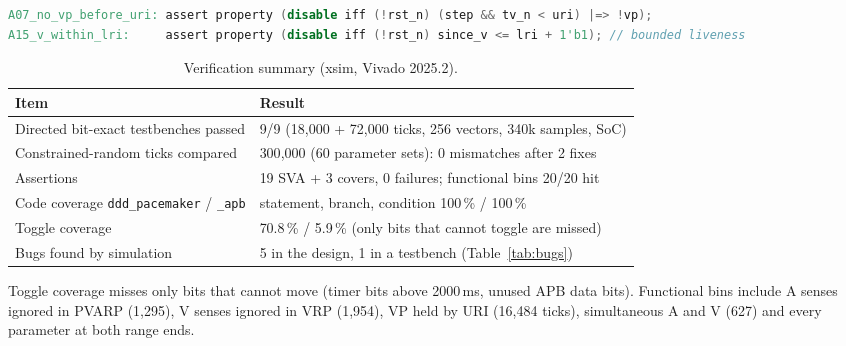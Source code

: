 \documentclass[11pt,a4paper]{article}
\begin{document}
\begin{lstlisting}[language=Verilog,caption={Two of the 19 SVA assertions (bound to \texttt{ddd\_pacemaker}).},label={lst:sva}]
A07_no_vp_before_uri: assert property (disable iff (!rst_n) (step && tv_n < uri) |=> !vp);
A15_v_within_lri:     assert property (disable iff (!rst_n) since_v <= lri + 1'b1); // bounded liveness
\end{lstlisting}

\begin{table}[!tbp]\centering\footnotesize
\caption{Verification summary (xsim, Vivado 2025.2).}\label{tab:simsummary}
\begin{tabularx}{\linewidth}{@{}Xl@{}}
\toprule
Item & Result\\
\midrule
Directed bit-exact testbenches passed & 9/9 (18{,}000 + 72{,}000 ticks, 256 vectors, 340k samples, SoC)\\
Constrained-random ticks compared & 300{,}000 (60 parameter sets): 0 mismatches after 2 fixes\\
Assertions & 19 SVA + 3 covers, 0 failures; functional bins 20/20 hit\\
Code coverage \texttt{ddd\_pacemaker} / \texttt{\_apb} & statement, branch, condition 100\,\% / 100\,\%\\
Toggle coverage & 70.8\,\% / 5.9\,\% (only bits that cannot toggle are missed)\\
Bugs found by simulation & 5 in the design, 1 in a testbench (Table~\ref{tab:bugs})\\
\bottomrule
\end{tabularx}
\end{table}

Toggle coverage misses only bits that cannot move (timer bits above 2000\,ms, unused APB data bits).
Functional bins include A senses ignored in PVARP (1{,}295), V senses ignored in VRP (1{,}954), VP held
by URI (16{,}484 ticks), simultaneous A and V (627) and every parameter at both range ends.
\end{document}
